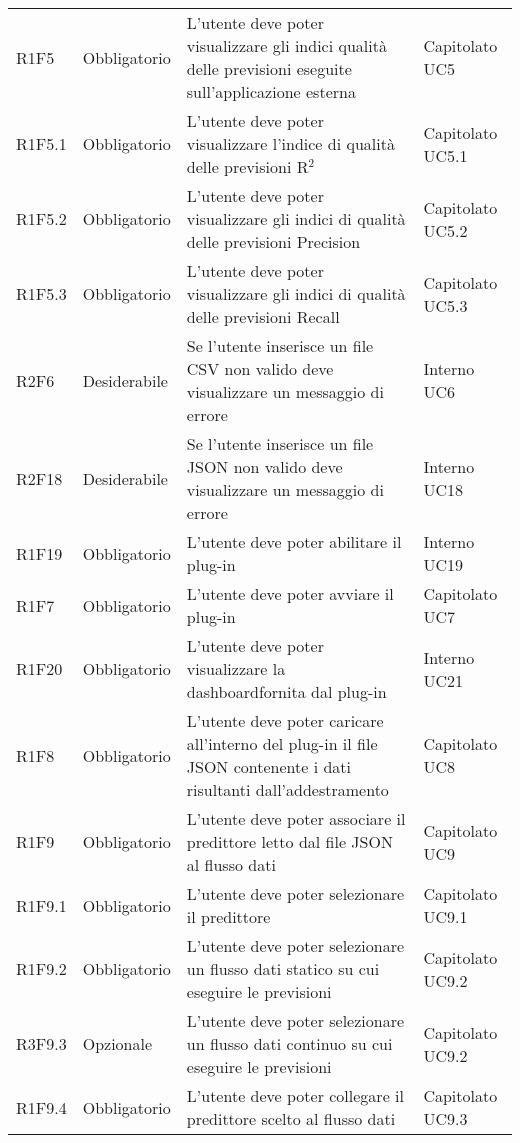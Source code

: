 \begin{longtable} {
		>{}p{24mm} 
		>{}p{32mm}
		>{}p{40mm} 
		>{}p{24.5mm}
		}
		R1F5 & Obbligatorio & L'utente deve poter visualizzare gli indici qualità delle previsioni eseguite sull'applicazione esterna & Capitolato UC5 \TBstrut \\ [2mm]
		R1F5.1 & Obbligatorio & L'utente deve poter visualizzare l'indice di qualità delle previsioni R$^{2}$\glo & Capitolato UC5.1 \TBstrut \\ [2mm]
		R1F5.2 & Obbligatorio & L'utente deve poter visualizzare gli indici di qualità delle previsioni Precision & Capitolato UC5.2 \TBstrut \\ [2mm]
		R1F5.3 & Obbligatorio & L'utente deve poter visualizzare gli indici di qualità delle previsioni Recall & Capitolato UC5.3 \TBstrut \\ [2mm]
		R2F6 & Desiderabile & Se l'utente inserisce un file CSV non valido deve visualizzare un messaggio di errore & Interno UC6 \TBstrut \\ [2mm]
		R2F18 & Desiderabile & Se l'utente inserisce un file JSON non valido deve visualizzare un messaggio di errore & Interno UC18 \TBstrut \\ [2mm]
		R1F19 & Obbligatorio & L'utente deve poter abilitare il plug-in & Interno UC19 \TBstrut \\ [2mm]
		R1F7 & Obbligatorio & L'utente deve poter avviare il plug-in & Capitolato UC7 \TBstrut \\ [2mm]
		R1F20 & Obbligatorio & L'utente deve poter visualizzare la dashboard\glosp fornita dal plug-in & Interno UC21 \TBstrut \\ [2mm]
		R1F8 & Obbligatorio & L'utente deve poter caricare all'interno del plug-in il file JSON contenente i dati risultanti dall'addestramento & Capitolato UC8 \TBstrut \\ [2mm]
		R1F9 & Obbligatorio & L'utente deve poter associare il predittore letto dal file JSON al flusso dati & Capitolato UC9 \TBstrut \\ [2mm]
		R1F9.1 & Obbligatorio & L'utente deve poter selezionare il predittore & Capitolato UC9.1 \TBstrut \\ [2mm]
		R1F9.2 & Obbligatorio & L'utente deve poter selezionare un flusso dati statico su cui eseguire le previsioni & Capitolato UC9.2 \TBstrut \\ [2mm]
		R3F9.3 & Opzionale & L'utente deve poter selezionare un flusso dati continuo su cui eseguire le previsioni & Capitolato UC9.2 \TBstrut \\ [2mm]
		R1F9.4 & Obbligatorio & L'utente deve poter collegare il predittore scelto al flusso dati & Capitolato UC9.3 \TBstrut \\ [2mm]

\end{longtable}
